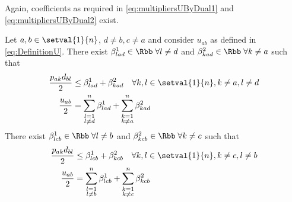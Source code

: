 Again, coefficients as required in \eqref{eq:multipliersUByDual1} and \eqref{eq:multipliersUByDual2} exist.
\begin{lemma}
	\label{lemma:ExistenceMultipliersUByDual}
	Let $a,b\in\setval{1}{n}$, $d\neq b, c\neq a$ and consider $u_{ab}$ as defined in \eqref{eq:DefinitionU}. There exist $\beta^1_{lad}\in\Rbb\;\forall l\neq d$ and $\beta^2_{kad}\in\Rbb\;\forall k\neq a$ such that
	\begin{align*}
		\frac{p_{ak}d_{bl}}{2}&\leq \beta^1_{lad}+\beta^2_{kad}\quad\forall k,l\in\setval{1}{n}, k\neq a, l\neq d\\
		\frac{u_{ab}}{2}&=\sum_{\substack{l=1\\l\neq d}}^n\beta^1_{lad} + \sum_{\substack{k=1\\k\neq a}}^n\beta^2_{kad}
	\end{align*}
	There exist $\beta^1_{lcb}\in\Rbb\;\forall l\neq b$ and $\beta^2_{kcb}\in\Rbb\;\forall k\neq c$ such that
	\begin{align*}
		\frac{p_{ak}d_{bl}}{2}&\leq \beta^1_{lcb}+\beta^2_{kcb}\quad\forall k,l\in\setval{1}{n}, k\neq c, l\neq b\\
		\frac{u_{ab}}{2}&=\sum_{\substack{l=1\\l\neq b}}^n\beta^1_{lcb} + \sum_{\substack{k=1\\k\neq c}}^n\beta^2_{kcb}
	\end{align*}
\end{lemma}
